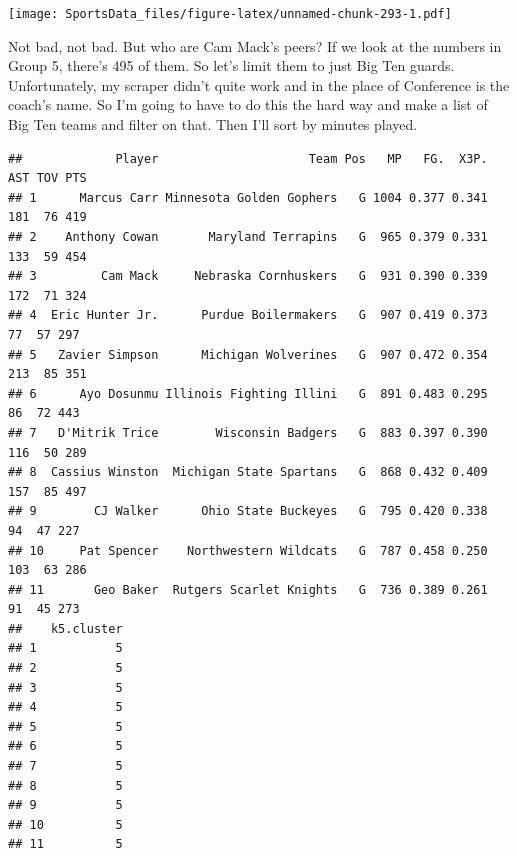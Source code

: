 \documentclass[]{book}
\newenvironment{Shaded}{\begin{snugshade}}{\end{snugshade}}
\newcommand{\DecValTok}[1]{\textcolor[rgb]{0.00,0.00,0.81}{#1}}
\newcommand{\KeywordTok}[1]{\textcolor[rgb]{0.13,0.29,0.53}{\textbf{#1}}}
\newcommand{\NormalTok}[1]{#1}
\newcommand{\OperatorTok}[1]{\textcolor[rgb]{0.81,0.36,0.00}{\textbf{#1}}}
\newcommand{\StringTok}[1]{\textcolor[rgb]{0.31,0.60,0.02}{#1}}
\begin{document}
\texttt{[image: SportsData\_files/figure-latex/unnamed-chunk-293-1.pdf]}

Not bad, not bad. But who are Cam Mack's peers? If we look at the numbers in Group 5, there's 495 of them. So let's limit them to just Big Ten guards. Unfortunately, my scraper didn't quite work and in the place of Conference is the coach's name. So I'm going to have to do this the hard way and make a list of Big Ten teams and filter on that. Then I'll sort by minutes played.

\begin{Shaded}
\end{Shaded}

\begin{verbatim}
##             Player                     Team Pos   MP   FG.  X3P. AST TOV PTS
## 1      Marcus Carr Minnesota Golden Gophers   G 1004 0.377 0.341 181  76 419
## 2    Anthony Cowan       Maryland Terrapins   G  965 0.379 0.331 133  59 454
## 3         Cam Mack     Nebraska Cornhuskers   G  931 0.390 0.339 172  71 324
## 4  Eric Hunter Jr.      Purdue Boilermakers   G  907 0.419 0.373  77  57 297
## 5   Zavier Simpson      Michigan Wolverines   G  907 0.472 0.354 213  85 351
## 6      Ayo Dosunmu Illinois Fighting Illini   G  891 0.483 0.295  86  72 443
## 7   D'Mitrik Trice        Wisconsin Badgers   G  883 0.397 0.390 116  50 289
## 8  Cassius Winston  Michigan State Spartans   G  868 0.432 0.409 157  85 497
## 9        CJ Walker      Ohio State Buckeyes   G  795 0.420 0.338  94  47 227
## 10     Pat Spencer    Northwestern Wildcats   G  787 0.458 0.250 103  63 286
## 11       Geo Baker  Rutgers Scarlet Knights   G  736 0.389 0.261  91  45 273
##    k5.cluster
## 1           5
## 2           5
## 3           5
## 4           5
## 5           5
## 6           5
## 7           5
## 8           5
## 9           5
## 10          5
## 11          5
\end{verbatim}
\end{document}
